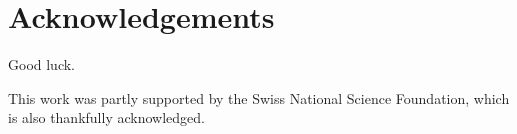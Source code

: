
\chapter{Acknowledgements}

Good luck.

\vspace{2cm}

\noindent This work was partly supported by the Swiss National Science Foundation, which is also thankfully acknowledged.

\cleardoublepage
